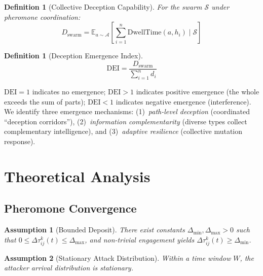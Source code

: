 \documentclass[review,3p,twocolumn]{elsarticle}
\newtheorem{definition}[theorem]{Definition}
\newtheorem{assumption}{Assumption}
\newcommand{\calA}{\mathcal{A}}
\newcommand{\calS}{\mathcal{S}}
\newcommand{\DEI}{\mathrm{DEI}}
\begin{document}
\begin{definition}[Collective Deception Capability]
For the swarm $\calS$ under pheromone coordination:
\begin{equation}
D_{\mathrm{swarm}} = \mathbb{E}_{a \sim \calA} \left[ \sum_{i=1}^{n} \mathrm{DwellTime}(a, h_i) \mid \calS \right]
\end{equation}
\end{definition}

\begin{definition}[Deception Emergence Index]
\begin{equation}
\label{eq:dei}
\DEI = \frac{D_{\mathrm{swarm}}}{\sum_{i=1}^{n} d_i}
\end{equation}
\end{definition}

$\DEI = 1$ indicates no emergence; $\DEI > 1$ indicates positive emergence (the whole exceeds the sum of parts); $\DEI < 1$ indicates negative emergence (interference). We identify three emergence mechanisms: (1)~\emph{path-level deception} (coordinated ``deception corridors''), (2)~\emph{information complementarity} (diverse types collect complementary intelligence), and (3)~\emph{adaptive resilience} (collective mutation response).


\section{Theoretical Analysis}
\label{sec:theory}

\subsection{Pheromone Convergence}

\begin{assumption}[Bounded Deposit]
\label{asm:bounded}
There exist constants $\Delta_{\min}, \Delta_{\max} > 0$ such that $0 \leq \Delta\tau_{ij}^k(t) \leq \Delta_{\max}$, and non-trivial engagement yields $\Delta\tau_{ij}^k(t) \geq \Delta_{\min}$.
\end{assumption}

\begin{assumption}[Stationary Attack Distribution]
\label{asm:stationary}
Within a time window $W$, the attacker arrival distribution is stationary.
\end{assumption}
\end{document}
